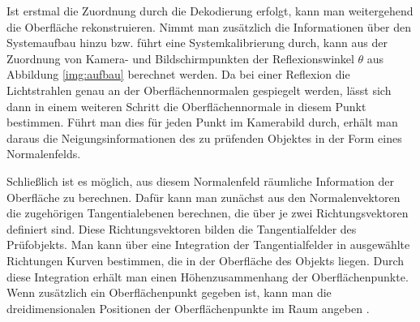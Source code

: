 Ist erstmal die Zuordnung durch die Dekodierung erfolgt, kann man weitergehend die Oberfläche rekonstruieren.
Nimmt man zusätzlich die Informationen über den Systemaufbau hinzu bzw. führt eine Systemkalibrierung durch, kann aus der Zuordnung von Kamera- und Bildschirmpunkten der Reflexionswinkel $\theta$ aus Abbildung \ref{img:aufbau} berechnet werden.
Da bei einer Reflexion die Lichtstrahlen genau an der Oberflächennormalen gespiegelt werden, lässt sich dann in einem weiteren Schritt die Oberflächennormale in diesem Punkt bestimmen.
Führt man dies für jeden Punkt im Kamerabild durch, erhält man daraus die Neigungsinformationen des zu prüfenden Objektes in der Form eines Normalenfelds.

\p
Schließlich ist es möglich, aus diesem Normalenfeld räumliche Information der Oberfläche zu berechnen.
Dafür kann man zunächst aus den Normalenvektoren die zugehörigen Tangentialebenen berechnen, die über je zwei Richtungsvektoren definiert sind.
Diese Richtungsvektoren bilden die Tangentialfelder des Prüfobjekts.
Man kann über eine Integration der Tangentialfelder in ausgewählte Richtungen Kurven bestimmen, die in der Oberfläche des Objekts liegen.
Durch diese Integration erhält man einen Höhenzusammen\-hang der Oberflächenpunkte.
Wenn zusätzlich ein Oberflächenpunkt gegeben ist, kann man die dreidimensionalen Positionen der Oberflächenpunkte im Raum angeben \cite{kit_werling}.